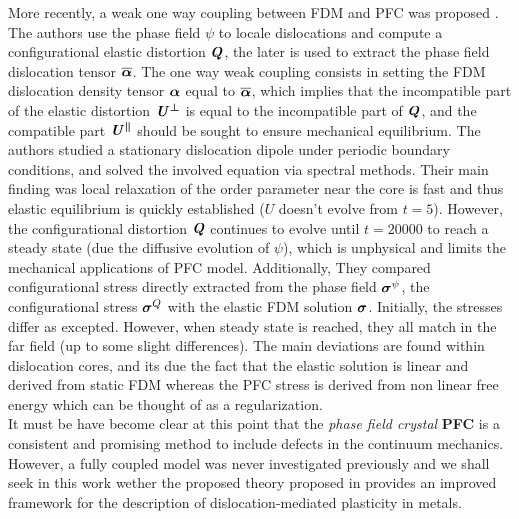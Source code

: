 \documentclass[11pt]{article}
\begin{document}
More recently, a weak one way coupling between FDM and PFC was proposed \parencite{upadhyayCouplingPhase2024}. The authors use the phase field $\psi$ to locale dislocations and compute a configurational elastic distortion $\bm{\mathit{Q}}$, the later is used to extract the phase field dislocation tensor $\overline{\bm{\mathit{\alpha}}}$. The one way weak coupling consists in setting the FDM dislocation density tensor $\bm{\mathit{\alpha}}$ equal to $\overline{\bm{\mathit{\alpha}}}$, which implies that the incompatible part of the elastic distortion $\bm{\mathit{U^\perp}}$ is equal to the incompatible part of $\bm{\mathit{Q}}$, and the compatible part $\bm{\mathit{U^\|}}$ should be sought to ensure mechanical equilibrium. The authors studied a stationary dislocation dipole under periodic boundary conditions, and solved the involved equation via spectral methods. Their main finding was local relaxation of the order parameter near the core is fast and thus elastic equilibrium is quickly established ($U$ doesn't evolve from $t=5$). However, the configurational distortion $\bm{\mathit{Q}}$ continues to evolve until $t=20000$ to reach a steady state (due the diffusive evolution of $\psi$), which is unphysical and limits the mechanical applications of PFC model. Additionally, They compared configurational stress directly extracted from the phase field $\bm{\mathit{\sigma}}^\psi$, the configurational stress $\bm{\mathit{\sigma}}^Q$ with the elastic FDM solution $\bm{\mathit{\sigma}}$. Initially, the stresses differ as excepted. However, when steady state is reached, they all match in the far field (up to some slight differences). The main deviations are found within dislocation cores, and its due the fact that the elastic solution is linear and derived from static FDM whereas the PFC stress is derived from non linear free energy which can be thought of  as a regularization.\\

It must be have become clear at this point that the \emph{phase field crystal} \textbf{PFC} is a consistent and promising method to include defects in the continuum mechanics. However, a fully coupled model was never investigated previously and we shall seek in this work wether the proposed theory proposed in \parencite{acharyaFielddislocation2020} provides an improved framework for the description of dislocation-mediated plasticity in metals. 
\end{document}
